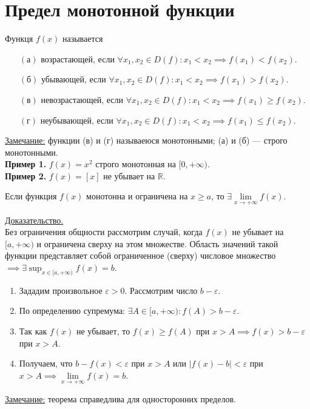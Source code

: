 \documentclass{article}
\begin{document}
\section{Предел монотонной функции}
\begin{definition}
    Функця \(f(x)\) называется
    \begin{itemize}
        \item[$\left(\text{а}\right)$] возрастающей, если \(\forall x_{1}, x_{2} \in D(f): x_{1} <  x_{2} \implies f(x_{1}) < f(x_{2})\).
        \item[$\left(\text{б}\right)$] убывающей, если \(\forall x_{1}, x_{2} \in D(f): x_{1} <  x_{2} \implies f(x_{1}) > f(x_{2})\). 
        \item[$\left(\text{в}\right)$] невозрастающей, если \(\forall x_{1}, x_{2} \in D(f): x_{1} <  x_{2} \implies f(x_{1}) \geq f(x_{2})\). 
        \item[$\left(\text{г}\right)$] неубывающей, если \(\forall x_{1}, x_{2} \in D(f): x_{1} <  x_{2} \implies f(x_{1}) \leq f(x_{2})\). 
    \end{itemize}
\end{definition}
\noindent
\underline{Замечание:} функции (в) и (г) называеюся монотонными; (а) и (б) --- строго монотонными.\\[0.1cm]
\textbf{Пример 1.} \(f(x) = x^2\) строго монотонная на \({[0, +\infty)}\).\\
\textbf{Пример 2.} \(f(x) = \left[x\right]\) не убывает на \(\mathbb{R}\).

\begin{theorem}
    Если функция \(f(x)\) монотонна и ограничена на \(x \geq a\), то \(\exists \lim\limits_{x \to +\infty}f(x)\).  
\end{theorem}
\noindent
\underline{Доказательство.}\\[0.1cm]
Без ограничения общности рассмотрим случай, когда \(f(x)\) не убывает на \({[a, +\infty)}\) и ограничена сверху на этом множестве.
Область значений такой функции представляет собой ограниченное (сверху) числовое множество \(\displaystyle \implies \exists \sup_{x \in [a, +\infty)}f(x) = b\).
\begin{enumerate}
    \item Зададим произвольное \(\varepsilon >0\). Рассмотрим число \(b - \varepsilon\).
    \item По определению супремума: \(\exists A \in [a, +\infty): f(A) > b - \varepsilon\).
    \item Так как \(f(x)\) не убывает, то \(f(x) \geq f(A)\) при \(x > A \implies f(x) > b - \varepsilon\) при \(x > A\).
    \item Получаем, что \(b - f(x) < \varepsilon\) при \(x > A\) или \(\vert f(x) - b \vert < \varepsilon\) при \(x > A \implies \lim\limits_{x \to +\infty}f(x) = b\).          
\end{enumerate}
\noindent
\underline{Замечание:} теорема справедлива для односторонних пределов.
\end{document}
